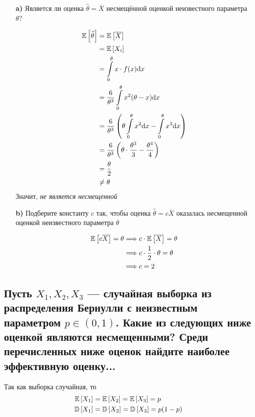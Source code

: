 \documentclass{article}
\begin{document}
\begin{itemize}
    \item[\textbf{a)}] Является ли оценка $\widehat{\theta}=\overline{X}$ несмещённой оценкой неизвестного параметра $\theta$?
    
    \begin{equation*}
        \begin{aligned}
            \mathbb{E}\left[\widehat{\theta}\right]&=\mathbb{E}\left[\overline{X}\right]\\
            &=\mathbb{E}\left[X_i\right]\\
            &=\int\limits_0^{\theta}x\cdot f(x)\text{d}x\\
            &=\frac{6}{\theta^3}\int\limits_0^{\theta}x^2(\theta-x)\text{d}x\\
            &=\frac{6}{\theta^3}\left(\theta\int\limits_0^{\theta}x^2\text{d}x-\int\limits_0^{\theta}x^3\text{d}x\right)\\
            &=\frac{6}{\theta^3}\left(\theta\cdot\frac{\theta^3}{3}-\frac{\theta^4}{4}\right)\\
            &=\frac{\theta}{2}\\
            &\ne\theta
        \end{aligned}
    \end{equation*}
    Значит, \textit{не является несмещенной}

    \item[\textbf{b)}] Подберите константу $c$ так, чтобы оценка $\hat{\theta}=c\overline{X}$ оказалась несмещенной оценкой неизвестного параметра $\theta$
    
    \begin{equation*}
        \begin{aligned}
            \mathbb{E}\left[c\overline{X}\right]=\theta&\Longrightarrow c\cdot\mathbb{E}\left[\overline{X}\right]=\theta\\
            &\Longrightarrow c\cdot\frac{1}{2}\cdot\theta=\theta\\
            &\Longrightarrow c=2
        \end{aligned}
    \end{equation*}
\end{itemize}

\subsection{Пусть $X_1, X_2, X_3$ — случайная выборка из распределения Бернулли с неизвестным параметром $p \in(0,1)$. Какие из следующих ниже оценкой являются несмещенными? Среди перечисленных ниже оценок найдите наиболее эффективную оценку...}
\comment Так как выборка случайная, то
\begin{equation*}
    \begin{aligned}
        \mathbb{E}\left[X_1\right]&=\mathbb{E}\left[X_2\right]=\mathbb{E}\left[X_3\right]=p\\
        \mathbb{D}\left[X_1\right]&=\mathbb{D}\left[X_2\right]=\mathbb{D}\left[X_3\right]=p(1-p)
    \end{aligned}
\end{equation*}
\end{document}
